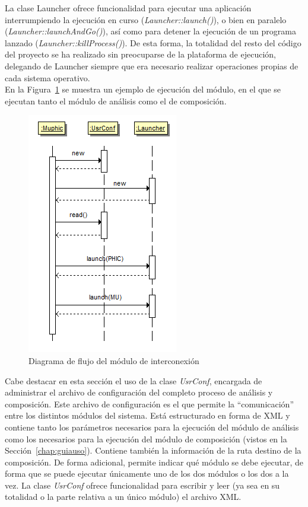 La clase Launcher ofrece funcionalidad para ejecutar una aplicación interrumpiendo la ejecución en curso (\emph{Launcher::launch()}), o bien en paralelo (\emph{Launcher::launchAndGo()}), así como para detener la ejecución de un programa lanzado (\emph{Launcher::killProcess()}). De esta forma, la totalidad del resto del código del proyecto se ha realizado sin preocuparse de la plataforma de ejecución, delegando de Launcher siempre que era necesario realizar operaciones propias de cada sistema operativo.\\

En la Figura~\ref{fig:muphic-sec-diagram} se muestra un ejemplo de ejecución del módulo, en el que se ejecutan tanto el módulo de análisis como el de composición.\\

		\begin{figure}[!htbp]
		\centering
		\includegraphics[scale=0.6]{graphics/muphic-sec-diagram.png}
		\caption{Diagrama de flujo del módulo de interconexión}
		\label{fig:muphic-sec-diagram}
		\end{figure}
		
Cabe destacar en esta sección el uso de la clase \emph{UsrConf}, encargada de administrar el archivo de configuración del completo proceso de análisis y composición. Este archivo de configuración es el que permite la ``comunicación'' entre los distintos módulos del sistema. Está estructurado en forma de XML y contiene tanto los parámetros necesarios para la ejecución del módulo de análisis como los necesarios para la ejecución del módulo de composición (vistos en la Sección~\ref{chap:guiauso}). Contiene también la información de la ruta destino de la composición. De forma adicional, permite indicar qué módulo se debe ejecutar, de forma que se puede ejecutar únicamente uno de los dos módulos o los dos a la vez. La clase \emph{UsrConf} ofrece funcionalidad para escribir y leer (ya sea en su totalidad o la parte relativa a un único módulo) el archivo XML.\\

